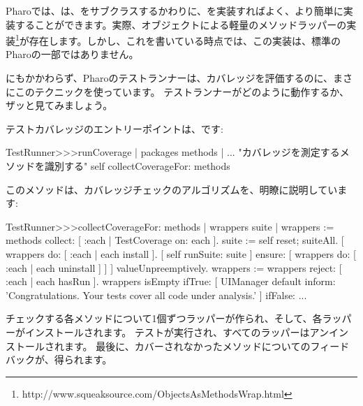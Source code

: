 \documentclass[a4paper,10pt,twoside]{book}
\begin{document}
Pharoでは、は、をサブクラスするかわりに、を実装すればよく、より簡単に実装することができます。実際、オブジェクトによる軽量のメソッドラッパーの実装\footnote{http://www.squeaksource.com/ObjectsAsMethodsWrap.html}が存在します。しかし、これを書いている時点では、この実装は、標準のPharoの一部ではありません。

にもかかわらず、Pharoのテストランナーは、カバレッジを評価するのに、まさにこのテクニックを使っています。
テストランナーがどのように動作するか、ザッと見てみましょう。

テストカバレッジのエントリーポイントは、です:
\begin{code}{}
TestRunner>>>runCoverage
	| packages methods |
	... "カバレッジを測定するメソッドを識別する" %
	self collectCoverageFor: methods
\end{code}

このメソッドは、カバレッジチェックのアルゴリズムを、明瞭に説明しています:
\begin{code}{}
TestRunner>>>collectCoverageFor: methods
	| wrappers suite |
	wrappers := methods collect: [ :each | TestCoverage on: each ].
	suite := self
		reset;
		suiteAll.
	[ wrappers do: [ :each | each install ].
	  [ self runSuite: suite ] ensure: [ wrappers do: [ :each | each uninstall ] ] ] valueUnpreemptively.
	wrappers := wrappers reject: [ :each | each hasRun ].
	wrappers isEmpty 
		ifTrue: 
			[ UIManager default inform: 'Congratulations. Your tests cover all code under analysis.' ]
		ifFalse: ...
\end{code}
チェックする各メソッドについて1個ずつラッパーが作られ、そして、各ラッパーがインストールされます。
テストが実行され、すべてのラッパーはアンインストールされます。
最後に、カバーされなかったメソッドについてのフィードバックが、得られます。
\end{document}
